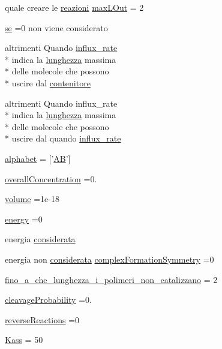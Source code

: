 \begin{DoxyCompactItemize}
quale creare le \hyperlink{a00065_a69962f56e60d0c88abc5d4b6839c2886}{reazioni} \hyperlink{a00065_abb126c97fed10420e64f85923bf5e04b}{max\-L\-Out} = 2
\item 
\hyperlink{a00065_a99032f27eaf45da350b544c68aa6467c}{se} =0 non viene considerato
\item 
altrimenti Quando \hyperlink{a00065_ad795c71664f3161dc8f7a769341daadf}{influx\-\_\-rate} \\*
indica la \hyperlink{a00058_a984d293145d85a936f430c0990316e51}{lunghezza} massima \\*
delle molecole che possono \\*
uscire dal \hyperlink{a00065_a8fcf98921930aa3720acdd081c5b0c2f}{contenitore}
\item 
altrimenti Quando influx\-\_\-rate \\*
indica la \hyperlink{a00058_a984d293145d85a936f430c0990316e51}{lunghezza} massima \\*
delle molecole che possono \\*
uscire dal quando \hyperlink{a00065_ad795c71664f3161dc8f7a769341daadf}{influx\-\_\-rate}
\item 
\hyperlink{a00065_abcbc32fc68e4323620d6171a17310212}{alphabet} = \mbox{[}'\hyperlink{a00063_abfef5bcdab19147dbfbb68112da17044}{A\-B}'\mbox{]}
\item 
\hyperlink{a00065_a59597688ed79473c0234f45eb9167574}{overall\-Concentration} =0.
\item 
\hyperlink{a00065_a9bc498ccac8db41438f855f5dd3f4c05}{volume} =1e-\/18
\item 
\hyperlink{a00065_ac002779c383d2cc783e881f94449de66}{energy} =0
\item 
energia \hyperlink{a00065_ad76697f83c5d8bf201c45822af227e21}{considerata}
\item 
energia non \hyperlink{a00065_ad76697f83c5d8bf201c45822af227e21}{considerata} \hyperlink{a00065_ac5d9cfec5453da5efc3e8d574b455833}{complex\-Formation\-Symmetry} =0
\item 
\hyperlink{a00065_ab6966d9ee620bc7376dc41a38352b948}{fino\-\_\-a\-\_\-che\-\_\-lunghezza\-\_\-i\-\_\-polimeri\-\_\-non\-\_\-catalizzano} = 2
\item 
\hyperlink{a00065_a9d512df05ee559766d2b8f08e4704b04}{cleavage\-Probability} =0.
\item 
\hyperlink{a00065_a650532b3a3c04865cc35cff6d567c5c0}{reverse\-Reactions} =0
\item 
\hyperlink{a00065_a484afe97369bc993daaa71613dd2a665}{Kass} = 50
\item 

\end{DoxyCompactItemize}
